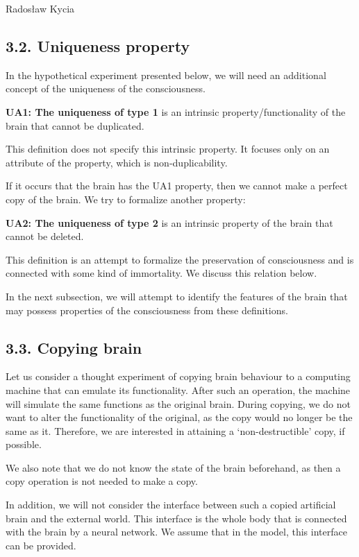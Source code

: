 \begin{artengenv}{Radosław Kycia}
\subsection{3.2. Uniqueness property}

In the hypothetical experiment presented below, we will need an additional concept of the uniqueness of the consciousness.

\begin{Definition}
 \textbf{UA1: The uniqueness of type 1} is an intrinsic property/functionality of the brain that cannot be duplicated.
\end{Definition}
This definition does not specify this intrinsic property. It focuses only on an attribute of the property, which is non-duplicability.

If it occurs that the brain has the UA1 property, then we cannot make a perfect copy of the brain. We try to formalize another property:
\begin{Definition}
 \textbf{UA2: The uniqueness of type 2} is an intrinsic property of the brain that cannot be deleted.
\end{Definition}
This definition is an attempt to formalize the preservation of consciousness and is connected with some kind of immortality. We discuss this relation below.

In the next subsection, we will attempt to identify the features of the brain that may possess properties of the consciousness from these definitions.

\subsection{3.3. Copying brain}

Let us consider a thought experiment of copying brain behaviour to a computing machine that can emulate its functionality. After such an operation, the machine will simulate the same functions as the original brain. During copying, we do not want to alter the functionality of the original, as the copy would no longer be the same as it. Therefore, we are interested in attaining a `non-destructible' copy, if possible. 

We also note that we do not know the state of the brain beforehand, as then a copy operation is not needed to make a copy.

In addition, we will not consider the interface between such a copied artificial brain and the external world. This interface is the whole body that is connected with the brain by a neural network. We assume that in the model, this interface can be provided.



\end{artengenv}
